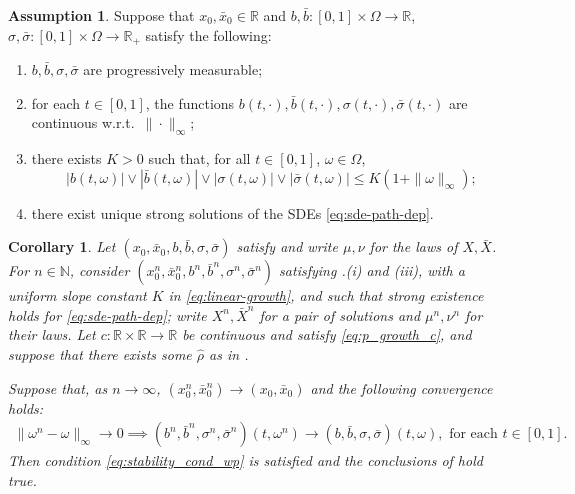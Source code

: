 \documentclass[oneside]{amsart}
\newtheorem{corollary}[theorem]{Corollary}
\theoremstyle{definition}
\newtheorem{assumption}[theorem]{Assumption}
\newcommand{\N}{\mathbb N}
\newcommand{\R}{\mathbb R}
\def\R{{\mathbb R}}
\numberwithin{equation}{section}
\begin{document}
\begin{assumption}\label{ass:stability}
Suppose that $x_0,\bar x_0 \in \R$ and $b, \bar b\colon [0, 1] \times \Omega \to \R$, $\sigma, \bar \sigma\colon [0, 1] \times \Omega \to \R_+$ satisfy the following:
	\begin{enumerate}[label = (\roman*)]
		\item $b,\bar b,\sigma,\bar\sigma$ are progressively measurable;
		\item for each $t\in [0, 1]$, the functions $b(t,\cdot),\bar b(t,\cdot),\sigma(t,\cdot),\bar\sigma(t,\cdot)$ are continuous w.r.t.\ $\|\cdot\|_\infty$;
		\item there exists $K>0$ such that, for all $t\in [0, 1]$, $\omega \in \Omega$,
			\begin{equation}\label{eq:linear-growth}
				|b(t,\omega)|\vee|\bar b(t,\omega)|\vee|\sigma(t,\omega)|\vee|\bar\sigma(t,\omega)|\leq K(1+\|\omega\|_\infty);
			\end{equation}
		\item there exist unique strong solutions of the SDEs \eqref{eq:sde-path-dep}.	
	\end{enumerate}
\end{assumption}



\begin{corollary}\label{cor:synchronous-stability} 
Let $(x_0,\bar x_0, b, \bar{b}, \sigma, \bar{\sigma})$ satisfy  and write $\mu, \nu$ for the laws of $X,\bar X$.
For $n\in\N$, consider $(x^n_0, \bar x^n_0,b^n,\bar b^n,\sigma^n,\bar\sigma^n)$ satisfying .(i) and (iii), with a uniform slope constant $K$ in \eqref{eq:linear-growth}, and such that strong existence holds for \eqref{eq:sde-path-dep}; write $X^n,\bar X^n$ for a pair of solutions and $\mu^n, \nu^n$ for their laws.
Let $c \colon \mathbb R\times \mathbb R \to\mathbb R$ be continuous and satisfy \eqref{eq:p_growth_c}, and suppose that there exists some $\hat\rho$ as in .

Suppose that, as $n \to \infty$, $(x^n_0,\bar x^n_0) \to (x_0,\bar x_0)$ and the following convergence holds:
\begin{align}\label{eq:unifconvassump}
\|\omega^n - \omega \|_\infty \to 0 \implies (b^n,\bar b^n,\sigma^n,\bar\sigma^n)(t,\omega^n)\to (b,\bar b,\sigma,\bar\sigma)(t,\omega), \text{ for each }t \in [0, 1].
\end{align}
Then condition \eqref{eq:stability_cond_wp} is satisfied and the conclusions of  hold true.
\end{corollary}
\end{document}
